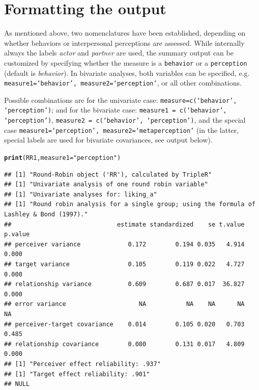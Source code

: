 \documentclass[a4paper]{article}\usepackage[]{graphicx}\usepackage[]{color}
\makeatletter
\newcommand{\hlstr}[1]{\textcolor[rgb]{0.192,0.494,0.8}{#1}}%
\newcommand{\hlstd}[1]{\textcolor[rgb]{0.345,0.345,0.345}{#1}}%
\newcommand{\hlkwc}[1]{\textcolor[rgb]{0.333,0.667,0.333}{#1}}%
\newcommand{\hlkwd}[1]{\textcolor[rgb]{0.737,0.353,0.396}{\textbf{#1}}}%
\newenvironment{kframe}{%
 \def\at@end@of@kframe{}%
 \ifinner\ifhmode%
  \def\at@end@of@kframe{\end{minipage}}%
  \begin{minipage}{\columnwidth}%
 \fi\fi%
 \def\FrameCommand##1{\hskip\@totalleftmargin \hskip-\fboxsep
 \colorbox{shadecolor}{##1}\hskip-\fboxsep
     \hskip-\linewidth \hskip-\@totalleftmargin \hskip\columnwidth}%
 \MakeFramed {\advance\hsize-\width
   \@totalleftmargin\z@ \linewidth\hsize
   \@setminipage}}%
 {\par\unskip\endMakeFramed%
 \at@end@of@kframe}
\newenvironment{knitrout}{}{} %
\makeatother
\begin{document}






\section{Formatting the output} 
As mentioned above, two nomenclatures have been established, depending on whether behaviors or interpersonal perceptions are assessed. While internally always the labels \emph{actor} and \emph{partner} are used, the summary output can be customized by specifying whether the measure is a \texttt{behavior} or a \texttt{perception} (default is \emph{behavior}). In bivariate analyses, both variables can be specified, e.g. \texttt{measure1=`behavior', measure2=`perception'}, or all other combinations.

Possible combinations are for the univariate case: \texttt{measure=c(`behavior', `perception')}; and for the bivariate case: \texttt{measure1 = c(`behavior', `perception')}, \texttt{measure2 = c(`behavior', `perception')}, and the special case \texttt{measure1=`perception', measure2=`metaperception'} (in the latter, special labels are used for bivariate covariances, see output below).

\begin{knitrout}\small
{}\color{fgcolor}\begin{kframe}
\begin{alltt}
\hlkwd{print}\hlstd{(RR1,} \hlkwc{measure1} \hlstd{=} \hlstr{"perception"}\hlstd{)}
\end{alltt}
\begin{verbatim}
## [1] "Round-Robin object ('RR'), calculated by TripleR"
## [1] "Univariate analysis of one round robin variable"
## [1] "Univariate analyses for: liking_a"
## [1] "Round robin analysis for a single group; using the formula of Lashley & Bond (1997)."
##                             estimate standardized    se t.value p.value
## perceiver variance             0.172        0.194 0.035   4.914   0.000
## target variance                0.105        0.119 0.022   4.727   0.000
## relationship variance          0.609        0.687 0.017  36.827   0.000
## error variance                    NA           NA    NA      NA      NA
## perceiver-target covariance    0.014        0.105 0.020   0.703   0.485
## relationship covariance        0.080        0.131 0.017   4.809   0.000
## [1] "Perceiver effect reliability: .937"
## [1] "Target effect reliability: .901"
## NULL
\end{verbatim}
\end{kframe}
\end{knitrout}
\end{document}
